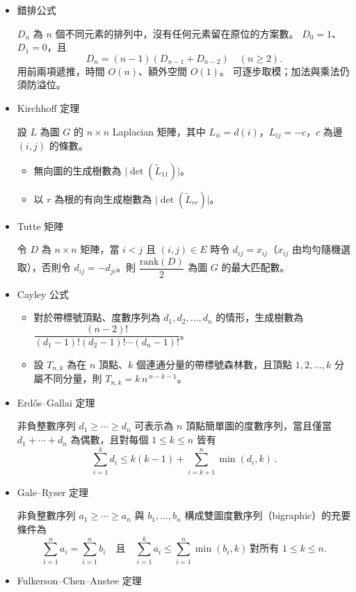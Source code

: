 \begin{itemize}
\item 錯排公式

$D_n$ 為 $n$ 個不同元素的排列中，沒有任何元素留在原位的方案數。
$D_0=1$、$D_1=0$，且
\[
D_n=(n-1)(D_{n-1}+D_{n-2})\quad(n\ge2).
\]
用前兩項遞推，時間 $O(n)$、額外空間 $O(1)$。
可逐步取模；加法與乘法仍須防溢位。

\item Kirchhoff 定理

設 $L$ 為圖 $G$ 的 $n\times n$ Laplacian 矩陣，其中 $L_{ii}=d(i)$，$L_{ij}=-c$，$c$ 為邊 $(i,j)$ 的條數。
\begin{itemize}
    \item 無向圖的生成樹數為 $\lvert \det(\tilde{L}_{11}) \rvert$。
    \item 以 $r$ 為根的有向生成樹數為 $\lvert \det(\tilde{L}_{rr}) \rvert$。
\end{itemize}

\item Tutte 矩陣

令 $D$ 為 $n\times n$ 矩陣，當 $i<j$ 且 $(i,j)\in E$ 時令 $d_{ij}=x_{ij}$（$x_{ij}$ 由均勻隨機選取），否則令 $d_{ij}=-d_{ji}$。則 $\dfrac{\mathrm{rank}(D)}{2}$ 為圖 $G$ 的最大匹配數。

\item Cayley 公式

\begin{itemize}
  \item 對於帶標號頂點、度數序列為 $d_1,d_2,\ldots,d_n$ 的情形，生成樹數為 $\dfrac{(n-2)!}{(d_1-1)!(d_2-1)!\cdots(d_n-1)!}$。
  \item 設 $T_{n,k}$ 為在 $n$ 頂點、$k$ 個連通分量的帶標號森林數，且頂點 $1,2,\ldots,k$ 分屬不同分量，則 $T_{n,k}=k\,n^{\,n-k-1}$。
\end{itemize}

\item Erdős–Gallai 定理

非負整數序列 $d_1\ge\cdots\ge d_n$ 可表示為 $n$ 頂點簡單圖的度數序列，當且僅當 $d_1+\cdots+d_n$ 為偶數，且對每個 $1\le k\le n$ 皆有
\[
\textstyle\sum_{i=1}^k d_i \le k(k-1)+\sum_{i=k+1}^n \min(d_i,k)\,.
\]

\item Gale–Ryser 定理

非負整數序列 $a_1\ge\cdots\ge a_n$ 與 $b_1,\ldots,b_n$ 構成雙圖度數序列（bigraphic）的充要條件為
\[
\textstyle\sum_{i=1}^n a_i=\sum_{i=1}^n b_i
\quad\text{且}\quad
\sum_{i=1}^k a_i\le \sum_{i=1}^n\min(b_i,k)\ \text{對所有 }1\le k\le n.
\]

\item Fulkerson–Chen–Anstee 定理


\end{itemize}
